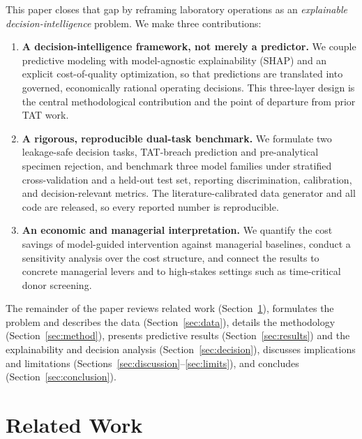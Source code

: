 \documentclass[journal]{IEEEtran}
\begin{document}
This paper closes that gap by reframing laboratory operations as an
\emph{explainable decision-intelligence} problem. We make three contributions:

\begin{enumerate}
\item \textbf{A decision-intelligence framework, not merely a predictor.} We
couple predictive modeling with model-agnostic explainability (SHAP) and an
explicit cost-of-quality optimization, so that predictions are translated into
governed, economically rational operating decisions. This three-layer design is
the central methodological contribution and the point of departure from prior TAT
work.
\item \textbf{A rigorous, reproducible dual-task benchmark.} We formulate two
leakage-safe decision tasks, TAT-breach prediction and pre-analytical specimen
rejection, and benchmark three model families under stratified cross-validation
and a held-out test set, reporting discrimination, calibration, and
decision-relevant metrics. The literature-calibrated data generator and all code
are released, so every reported number is reproducible.
\item \textbf{An economic and managerial interpretation.} We quantify the cost
savings of model-guided intervention against managerial baselines, conduct a
sensitivity analysis over the cost structure, and connect the results to concrete
managerial levers and to high-stakes settings such as time-critical donor
screening.
\end{enumerate}

The remainder of the paper reviews related work (Section~\ref{sec:related}),
formulates the problem and describes the data (Section~\ref{sec:data}), details
the methodology (Section~\ref{sec:method}), presents predictive results
(Section~\ref{sec:results}) and the explainability and decision analysis
(Section~\ref{sec:decision}), discusses implications and limitations
(Sections~\ref{sec:discussion}--\ref{sec:limits}), and concludes
(Section~\ref{sec:conclusion}).

\section{Related Work}\label{sec:related}
\end{document}
